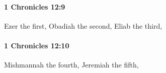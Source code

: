 		\paragraph{1 Chronicles 12:9} %
			\label{1CHRONICLES-12-9}

			Ezer the first, Obadiah the second, Eliab the third,


		\paragraph{1 Chronicles 12:10} %
			\label{1CHRONICLES-12-10}

			Mishmannah the fourth, Jeremiah the fifth,


